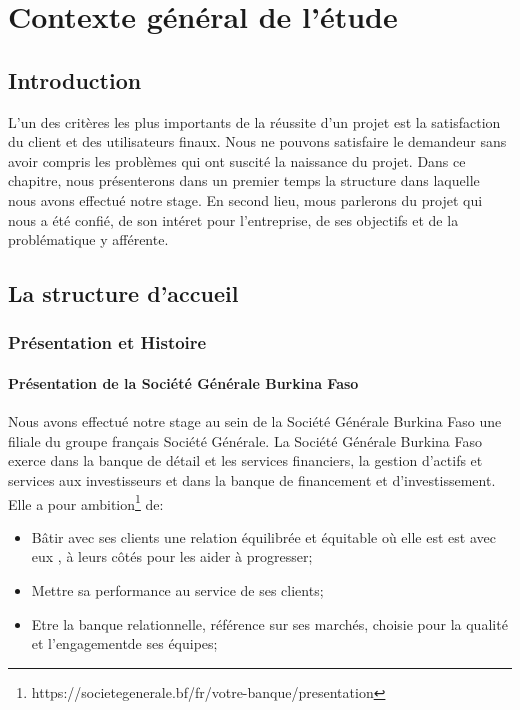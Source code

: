 \chapter{Contexte général de l'étude}

\section*{Introduction}
L’un des critères les plus importants de la réussite d’un projet est la 
satisfaction du client et des utilisateurs finaux. Nous ne pouvons satisfaire
le demandeur sans avoir compris les problèmes qui ont suscité la naissance du projet.
Dans ce chapitre, nous présenterons dans un premier temps la structure dans
laquelle nous avons effectué notre stage. En second lieu, mous parlerons du
projet qui nous a été confié, de son intéret pour l'entreprise, de ses
objectifs et de la problématique y afférente.

\section{La structure d'accueil}

\subsection{Présentation et Histoire}

 \subsubsection{Présentation de la Société Générale Burkina Faso}

 Nous avons effectué notre stage au sein de la Société Générale Burkina Faso 
une filiale du groupe français  Société
Générale.
La Société Générale Burkina Faso exerce dans la banque de détail et les services
financiers, la gestion d’actifs et services aux investisseurs et dans la banque
de financement et d’investissement. Elle a pour ambition\footnote{https://societegenerale.bf/fr/votre-banque/presentation}
de:
\begin{itemize}
  \item Bâtir avec ses clients une relation équilibrée et équitable où elle est
    est avec eux , à leurs côtés pour les aider à progresser;
  \item Mettre sa performance au service de ses clients;
  \item Etre la banque relationnelle, référence sur ses marchés, choisie pour la
    qualité et l'engagementde ses équipes;
\end{itemize}

